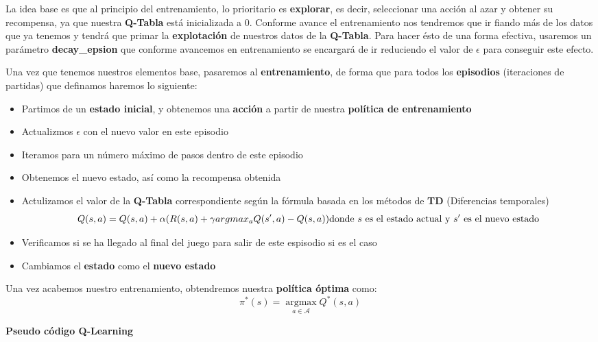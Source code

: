 \documentclass[
  a4paper,
  DIV=11,
  numbers=noendperiod]{scrreprt}
\providecommand{\tightlist}{%
  \setlength{\itemsep}{0pt}\setlength{\parskip}{0pt}}\usepackage{longtable,booktabs,array}
\begin{document}
La idea base es que al principio del entrenamiento, lo prioritario es
\textbf{explorar}, es decir, seleccionar una acción al azar y obtener su
recompensa, ya que nuestra \textbf{Q-Tabla} está inicializada a 0.
Conforme avance el entrenamiento nos tendremos que ir fiando más de los
datos que ya tenemos y tendrá que primar la \textbf{explotación} de
nuestros datos de la \textbf{Q-Tabla}. Para hacer ésto de una forma
efectiva, usaremos un parámetro \textbf{decay\_epsion} que conforme
avancemos en entrenamiento se encargará de ir reduciendo el valor de
\(\epsilon\) para conseguir este efecto.

Una vez que tenemos nuestros elementos base, pasaremos al
\textbf{entrenamiento}, de forma que para todos los \textbf{episodios}
(iteraciones de partidas) que definamos haremos lo siguiente:

\begin{itemize}
\tightlist
\item
  Partimos de un \textbf{estado inicial}, y obtenemos una
  \textbf{acción} a partir de nuestra \textbf{política de entrenamiento}
\item
  Actualizmos \(\epsilon\) con el nuevo valor en este episodio
\item
  Iteramos para un número máximo de pasos dentro de este episodio
\item
  Obtenemos el nuevo estado, así como la recompensa obtenida
\item
  Actulizamos el valor de la \textbf{Q-Tabla} correspondiente según la
  fórmula basada en los métodos de \textbf{TD} (Diferencias temporales)
  \[
  Q(s,a) = Q(s,a) + \alpha(R(s,a)+\gamma argmax_aQ(s',a) - Q(s,a))\\
  \text{donde }s\text{ es el estado actual y }s'\text{ es el nuevo estado}
  \]
\item
  Verificamos si se ha llegado al final del juego para salir de este
  espisodio si es el caso
\item
  Cambiamos el \textbf{estado} como el \textbf{nuevo estado}
\end{itemize}

Una vez acabemos nuestro entrenamiento, obtendremos nuestra
\textbf{política óptima} como: \[
\pi^*(s) = \mathop{\mathrm{argmax}}\limits_{a \in \mathcal A}Q^*(s,a)
\]

\textbf{Pseudo código Q-Learning}
\end{document}

